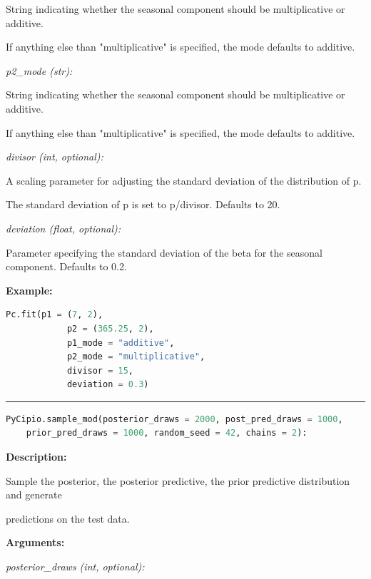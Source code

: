 \documentclass{article}
\begin{document}
\indent \indent \indent String indicating whether the seasonal component should be
multiplicative or additive. 

\indent \indent \indent If anything else than "multiplicative" is specified,
the mode defaults to additive.

\indent \indent \textit{p2\_mode (str):} 

\indent \indent \indent String indicating whether the seasonal component should be
multiplicative or additive. 

\indent \indent \indent If anything else than "multiplicative" is specified,
the mode defaults to additive.

\indent \indent \textit{divisor (int, optional):} 

\indent \indent \indent A scaling parameter for adjusting the standard deviation of the distribution
of p. 

\indent \indent \indent The standard deviation of p is set to p/divisor. Defaults to 20. 

\indent \indent \textit{deviation (float, optional):} 

\indent \indent \indent Parameter specifying the standard deviation of the beta for the seasonal
component. Defaults to 0.2.

\indent \textbf{Example:}

\begin{lstlisting}[language=Python]
        Pc.fit(p1 = (7, 2), 
            p2 = (365.25, 2), 
            p1_mode = "additive", 
            p2_mode = "multiplicative", 
            divisor = 15, 
            deviation = 0.3)    
\end{lstlisting}


\hrule

\begin{lstlisting}[language=Python]
    PyCipio.sample_mod(posterior_draws = 2000, post_pred_draws = 1000, 
    prior_pred_draws = 1000, random_seed = 42, chains = 2):
\end{lstlisting}

\indent \textbf{Description:} 

\indent \indent Sample the posterior, the posterior predictive, the prior predictive distribution and generate 

\indent \indent predictions on the test data.

\indent \textbf{Arguments:}

\indent \indent \textit{posterior\_draws (int, optional):} 
\end{document}

